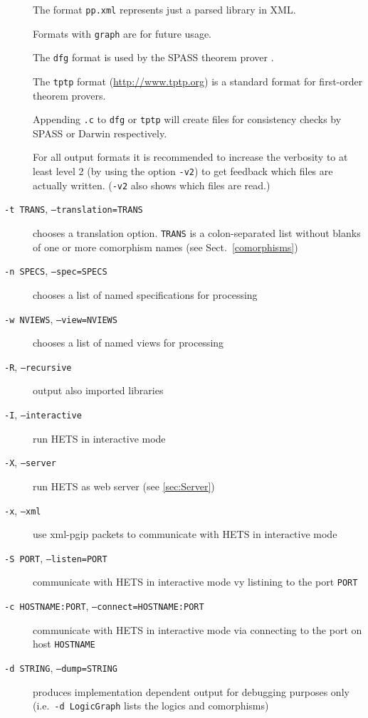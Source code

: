 \documentclass{article}
\newcommand{\normalTEXTSC}[2]{{#1\scriptsize#2}}
\newcommand     {\Hets}{\normalTEXTSC{H}{ETS}\xspace}
\newcommand     {\SPASS}{\normalTEXTSC{S}{PASS}\xspace}
\begin{document}
\begin{description}
The format \texttt{pp.xml} represents just a parsed library in XML.

Formats with \texttt{graph} are for future usage.

The \texttt{dfg} format is used by the \SPASS theorem prover
\cite{WeidenbachEtAl02}.

The \texttt{tptp} format (\url{http://www.tptp.org}) is a standard
format for first-order theorem provers.

Appending \texttt{.c} to \texttt{dfg} or \texttt{tptp} will create files for
consistency checks by SPASS or Darwin respectively.

For all output formats it is recommended to increase the verbosity to at least
level 2 (by using the option \texttt{-v2}) to get feedback which files are
actually written. (\texttt{-v2} also shows which files are read.)

\item[\texttt{-t TRANS}, \texttt{--translation=TRANS}]
chooses a translation option. \texttt{TRANS} is a colon-separated list
without blanks of one or more comorphism names (see Sect.~\ref{comorphisms})

\item[\texttt{-n SPECS}, \texttt{--spec=SPECS}]
chooses a list of named specifications for processing

\item[\texttt{-w NVIEWS}, \texttt{--view=NVIEWS}]
chooses a list of named views for processing

\item[\texttt{-R}, \texttt{--recursive}] output also imported libraries

\item[\texttt{-I}, \texttt{--interactive}] run \Hets in interactive mode

\item[\texttt{-X}, \texttt{--server}] run \Hets as web server (see
  \ref{sec:Server})

\item[\texttt{-x}, \texttt{--xml}] use xml-pgip packets to communicate with
  \Hets in interactive mode

\item[\texttt{-S PORT}, \texttt{--listen=PORT}] communicate
  with \Hets in interactive mode vy listining to the port \texttt{PORT}

\item[\texttt{-c HOSTNAME:PORT}, \texttt{--connect=HOSTNAME:PORT}] communicate
  with \Hets in interactive mode via connecting to the port on host
  \texttt{HOSTNAME}

\item[\texttt{-d STRING}, \texttt{--dump=STRING}] produces implementation
  dependent output for debugging purposes only
  (i.e.\ \texttt{-d LogicGraph} lists the logics and comorphisms)
\end{description}
\end{document}
